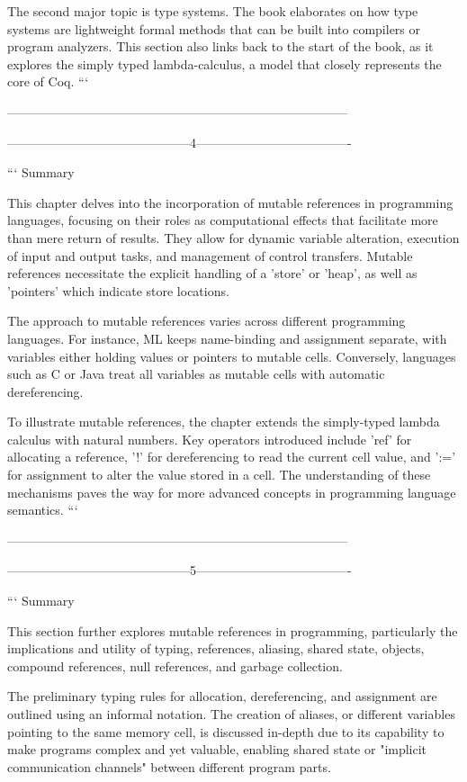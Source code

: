 The second major topic is type systems. The book elaborates on how type systems are lightweight formal methods that can be built into compilers or program analyzers. This section also links back to the start of the book, as it explores the simply typed lambda-calculus, a model that closely represents the core of Coq.
```

---------------------------------------------------------------------------------

--------------------------------------------4-------------------------------------

```
Summary

This chapter delves into the incorporation of mutable references in programming languages, focusing on their roles as computational effects that facilitate more than mere return of results. They allow for dynamic variable alteration, execution of input and output tasks, and management of control transfers. Mutable references necessitate the explicit handling of a 'store' or 'heap', as well as 'pointers' which indicate store locations.

The approach to mutable references varies across different programming languages. For instance, ML keeps name-binding and assignment separate, with variables either holding values or pointers to mutable cells. Conversely, languages such as C or Java treat all variables as mutable cells with automatic dereferencing.

To illustrate mutable references, the chapter extends the simply-typed lambda calculus with natural numbers. Key operators introduced include 'ref' for allocating a reference, '!' for dereferencing to read the current cell value, and ':=' for assignment to alter the value stored in a cell. The understanding of these mechanisms paves the way for more advanced concepts in programming language semantics.
```

---------------------------------------------------------------------------------

--------------------------------------------5-------------------------------------

```
Summary

This section further explores mutable references in programming, particularly the implications and utility of typing, references, aliasing, shared state, objects, compound references, null references, and garbage collection.

The preliminary typing rules for allocation, dereferencing, and assignment are outlined using an informal notation. The creation of aliases, or different variables pointing to the same memory cell, is discussed in-depth due to its capability to make programs complex and yet valuable, enabling shared state or "implicit communication channels" between different program parts.

